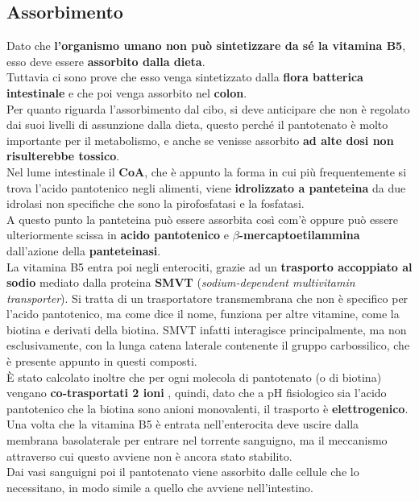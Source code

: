 \documentclass[a4paper, 12pt]{article}
\begin{document}
\subsection{Assorbimento}
Dato che \textbf{l’organismo umano non può sintetizzare da sé la vitamina B5}, esso deve essere \textbf{assorbito dalla dieta}.\\ Tuttavia ci sono prove che esso venga sintetizzato dalla \textbf{flora batterica intestinale} e che poi venga assorbito nel \textbf{colon}.\\
Per quanto riguarda l’assorbimento dal cibo, si deve anticipare che non è regolato dai suoi livelli di assunzione dalla dieta, questo perché il pantotenato è molto importante per il metabolismo, e anche se venisse assorbito \textbf{ad alte dosi non risulterebbe tossico}.\\
Nel lume intestinale il \textbf{CoA}, che è appunto la forma in cui più frequentemente si trova l’acido pantotenico negli alimenti, viene \textbf{idrolizzato a panteteina} da due idrolasi non specifiche che sono la pirofosfatasi e la fosfatasi.\\
A questo punto la panteteina può essere assorbita così com’è oppure può essere ulteriormente scissa in \textbf{acido pantotenico} e \textbf{$\beta$-mercaptoetilammina} dall’azione della \textbf{panteteinasi}.\\
La vitamina B5 entra poi negli enterociti, grazie ad un \textbf{trasporto accoppiato al sodio} mediato dalla proteina \textbf{SMVT} (\textit{sodium-dependent multivitamin transporter}). Si tratta di un trasportatore transmembrana che non è specifico per l’acido pantotenico, ma come dice il nome, funziona per altre vitamine, come la biotina e derivati della biotina. SMVT infatti interagisce principalmente, ma non esclusivamente, con la lunga catena laterale contenente il gruppo carbossilico, che è presente appunto in questi composti.\\
È stato calcolato inoltre che per ogni molecola di pantotenato (o di biotina) vengano \textbf{co-trasportati 2 ioni }, quindi, dato che a pH fisiologico sia l’acido pantotenico che la biotina sono anioni monovalenti, il trasporto è \textbf{elettrogenico}.\\
Una volta che la vitamina B5 è entrata nell’enterocita deve uscire dalla membrana basolaterale per entrare nel torrente sanguigno, ma il meccanismo attraverso cui questo avviene non è ancora stato stabilito.\\
Dai vasi sanguigni poi il pantotenato viene assorbito dalle cellule che lo necessitano, in modo simile a quello che avviene nell’intestino.\\
\end{document}
